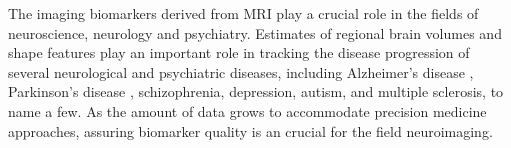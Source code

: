 The imaging biomarkers derived from MRI play a crucial role in the fields of neuroscience, neurology and psychiatry. Estimates of regional brain volumes and shape features play an important role in tracking the disease progression of several neurological and psychiatric diseases, including Alzheimer's disease \cite{Vemuri_2010}, Parkinson's disease \cite{Silvia_Mangia_2013}, schizophrenia\cite{shenton2001review}, depression\cite{meisenzahl2011structural}, autism\cite{brambilla2003brain}, and multiple sclerosis\cite{Filippi_1995}, to name a few. As the amount of data grows to accommodate precision medicine approaches, assuring biomarker quality is an crucial for the field neuroimaging. 

